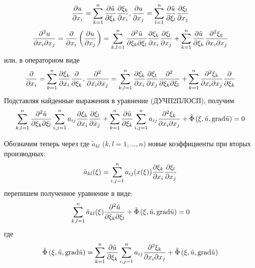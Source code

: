 \noindent
\[\frac{\partial u}{\partial x_{i} } =\sum _{k=1}^{n}\frac{\partial \tilde{u}}{\partial {\rm \xi }_{k} } \frac{\partial {\rm \xi }_{k} }{\partial x_{i} }  ,   \frac{\partial u}{\partial x_{j} } =\sum _{l=1}^{n}\frac{\partial \tilde{u}}{\partial {\rm \xi }_{l} } \frac{\partial {\rm \xi }_{l} }{\partial x_{j} }  \]
\[\frac{\partial ^{2} u}{\partial x_{i} \partial x_{j} } =\frac{\partial }{\partial x_{i} } \left(\frac{\partial u}{\partial x_{j} } \right)=\sum _{k,l=1}^{n}\frac{\partial ^{2} \tilde{u}}{\partial {\rm \xi }_{k} \partial {\rm \xi }_{l} } \frac{\partial {\rm \xi }_{k} }{\partial x_{i} } \frac{\partial {\rm \xi }_{l} }{\partial x_{j} }  +\sum _{k=1}^{n}\frac{\partial \tilde{u}}{\partial {\rm \xi }_{k} } \frac{\partial ^{2} {\rm \xi }_{k} }{\partial x_{i} \partial x_{j} }  \]
или, в операторном виде
\[\frac{\partial }{\partial x_{i} } =\sum _{k=1}^{n}\frac{\partial {\rm \xi }_{k} }{\partial x_{i} } \frac{\partial }{\partial {\rm \xi }_{k} }  ,  \frac{\partial ^{2} }{\partial x_{i} \partial x_{j} } =\sum _{k,l=1}^{n}\frac{\partial {\rm \xi }_{k} }{\partial x_{i} } \frac{\partial {\rm \xi }_{l} }{\partial x_{j} } \frac{\partial ^{2} }{\partial {\rm \xi }_{k} \partial {\rm \xi }_{l} }  +\sum _{k=1}^{n}\frac{\partial ^{2} {\rm \xi }_{k} }{\partial x_{i} \partial x_{j} } \frac{\partial }{\partial {\rm \xi }_{k} }  \]
Подставляя найденные выражения в уравнение (ДУЧП2ПЛОСП), получим
\[\sum _{k,l=1}^{n}\frac{\partial ^{2} \tilde{u}}{\partial {\rm \xi }_{k} \partial {\rm \xi }_{l} } \sum _{i,j=1}^{n}a_{ij} \frac{\partial {\rm \xi }_{k} }{\partial x_{i} } \frac{\partial {\rm \xi }_{l} }{\partial x_{j} }   +\sum _{k=1}^{n}\frac{\partial \tilde{u}}{\partial {\rm \xi }_{k} } \sum _{i,j=1}^{n}a_{ij} \frac{\partial ^{2} {\rm \xi }_{k} }{\partial x_{i} \partial x_{j} }   +\hat{\Phi }\left({\rm \xi },\tilde{u},{\rm grad}\tilde{u}\right)=0\]

Обозначим теперь через где $\tilde{a}_{kl} $ ($k,l=1,...,n$) новые коэффициенты при вторых производных:
\[\tilde{a}_{kl} ({\rm \xi })=\sum _{i,j=1}^{n}a_{ij} (x({\rm \xi }))\frac{\partial {\rm \xi }_{k} }{\partial x_{i} } \frac{\partial {\rm \xi }_{l} }{\partial x_{j} }  \]
перепишем полученное уравнение в виде:
\[\sum _{k,l=1}^{n}\tilde{a}_{kl} ({\rm \xi })\frac{\partial ^{2} \tilde{u}}{\partial {\rm \xi }_{k} \partial {\rm \xi }_{l} }  +\tilde{\Phi }\left({\rm \xi },\tilde{u},{\rm grad}\tilde{u}\right)=0\]
где
\[\tilde{\Phi }\left({\rm \xi },\tilde{u},{\rm grad}\tilde{u}\right)=\sum _{k=1}^{n}\frac{\partial \tilde{u}}{\partial {\rm \xi }_{k} } \sum _{i,j=1}^{n}a_{ij} \frac{\partial ^{2} {\rm \xi }_{k} }{\partial x_{i} \partial x_{j} }   +\hat{\Phi }\left({\rm \xi },\tilde{u},{\rm grad}\tilde{u}\right)\]


